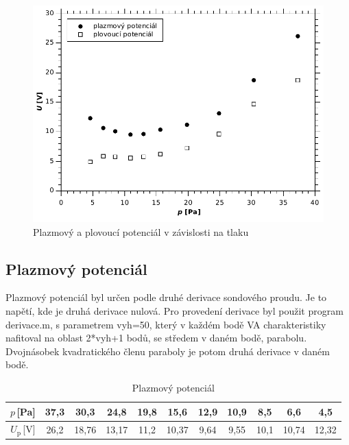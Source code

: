 \documentclass[12pt]{article}
\begin{document}
\begin{figure}[htbp]
\begin{center}
\includegraphics[width=12.8cm]{img/ufupl.pdf}
\caption{Plazmový a plovoucí potenciál v závislosti na tlaku}
\label{ufupl}
\end{center}
\end{figure}

\subsection{Plazmový potenciál}
Plazmový potenciál byl určen podle druhé derivace sondového proudu. Je to napětí, kde je druhá derivace nulová. Pro provedení derivace byl použit program derivace.m, s parametrem vyh=50, který v každém bodě VA charakteristiky nafitoval na oblast 2*vyh+1 bodů, se středem v daném bodě, parabolu. Dvojnásobek kvadratického členu paraboly je potom druhá derivace v daném bodě.

\begin{table}[htbp]
\begin{center}
\begin{tabular}{|c|c|c|c|c|c|c|c|c|c|c|}
\hline
$p$\,[Pa] & 37,3 & 30,3 & 24,8 & 19,8 & 15,6 & 12,9 & 10,9 & 8,5 & 6,6 & 4,5 \\ \hline
$U_\mathrm{p}$\,[V] & 26,2 & 18,76 & 13,17 & 11,2 & 10,37 & 9,64 & 9,55 & 10,1 & 10,74 & 12,32 \\ \hline
\end{tabular}
\caption{Plazmový potenciál}
\label{plptable}
\end{center}
\end{table}
\end{document}
